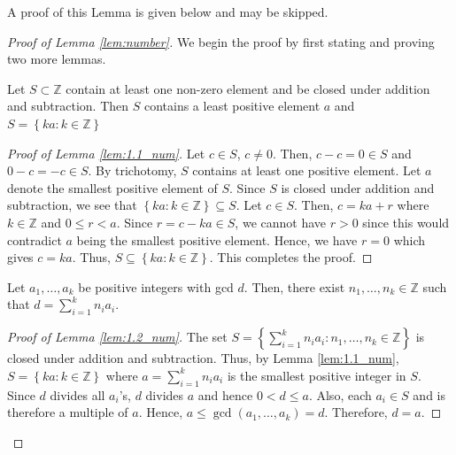\documentclass[12pt]{article}
\theoremstyle{definition}
\begin{document}
A proof of this Lemma is given below and may be skipped. 

\begin{proof}[Proof of Lemma \ref{lem:number}]
    We begin the proof by first stating and proving two more lemmas. 
    
    \begin{lem} \label{lem:1.1_num}
        Let $S \subset \mathbb{Z}$ contain at least one non-zero element and be closed under addition and subtraction. Then $S$ contains a least positive element $a$ and $S = \left\{ ka \colon k \in \mathbb{Z} \right\}$
    \end{lem}
    
    \begin{proof}[Proof of Lemma \ref{lem:1.1_num}]
        Let $c \in S$, $c \neq 0$. Then, $c-c = 0 \in S$ and $0-c = -c \in S$. By trichotomy, $S$ contains at least one positive element. Let $a$ denote the smallest positive element of $S$. Since $S$ is closed under addition and subtraction, we see that $\left\{ ka \colon k \in \mathbb{Z} \right\} \subseteq S$. Let $c \in S$. Then, $c = ka + r$ where $k \in \mathbb{Z}$ and $0 \leq r < a$. Since $r = c - ka \in S$, we cannot have $r > 0$ since this would contradict $a$ being the smallest positive element. Hence, we have $r=0$ which gives $c=ka$. Thus, $S \subseteq \left\{ ka \colon k \in \mathbb{Z} \right\}$. This completes the proof.
    \end{proof}
    
    \begin{lem} \label{lem:1.2_num}
        Let $a_1, \ldots, a_k$ be positive integers with gcd $d$. Then, there exist $n_1, \ldots, n_k \in \mathbb{Z}$ such that $d = \sum_{i=1}^{k} n_i a_i$.
    \end{lem}
    
    \begin{proof}[Proof of Lemma \ref{lem:1.2_num}]
        The set $S = \left\{ \sum_{i=1}^k n_i a_i \colon n_1, \ldots, n_k \in \mathbb{Z} \right\}$ is closed under addition and subtraction. Thus, by Lemma \ref{lem:1.1_num}, $S = \left\{ ka \colon k \in \mathbb{Z} \right\}$ where $a = \sum_{i=1}^k n_i a_i$ is the smallest positive integer in $S$. Since $d$ divides all $a_i$'s, $d$ divides $a$ and hence $0 < d \leq a$. Also, each $a_i \in S$ and is therefore a multiple of $a$. Hence, $a \leq \gcd\left( a_1, \ldots, a_k \right) = d$. Therefore, $d = a$. 
    \end{proof}
    

\end{proof}
\end{document}
